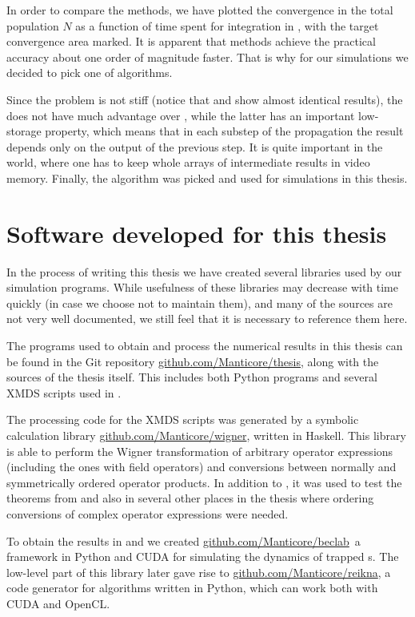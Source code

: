 In order to compare the methods, we have plotted the convergence in the total population $N$ as a function of time spent for integration in , with the target convergence area marked.
It is apparent that  methods achieve the practical accuracy about one order of magnitude faster.
That is why for our simulations we decided to pick one of  algorithms.

Since the problem is not stiff (notice that  and  show almost identical results), the  does not have much advantage over , while the latter has an important low-storage property, which means that in each substep of the  propagation the result depends only on the output of the previous step.
It is quite important in the  world, where one has to keep whole arrays of intermediate results in video memory.
Finally, the  algorithm was picked and used for simulations in this thesis.


\section{Software developed for this thesis}

In the process of writing this thesis we have created several libraries used by our simulation programs.
While usefulness of these libraries may decrease with time quickly (in case we choose not to maintain them), and many of the sources are not very well documented, we still feel that it is necessary to reference them here.

The programs used to obtain and process the numerical results in this thesis can be found in the Git repository \href{http://github.com/Manticore/thesis}{github.com/Manticore/thesis}, along with the sources of the thesis itself.
This includes both Python programs and several XMDS scripts used in .

The processing code for the XMDS scripts was generated by a symbolic calculation library \href{http://github.com/Manticore/wigner}{github.com/Manticore/wigner}, written in Haskell.
This library is able to perform the Wigner transformation of arbitrary operator expressions (including the ones with field operators) and conversions between normally and symmetrically ordered operator products.
In addition to , it was used to test the theorems from  and also in several other places in the thesis where ordering conversions of complex operator expressions were needed.

To obtain the results in  and  we created \href{http://github.com/Manticore/beclab}{github.com/Manticore/beclab} a framework in Python and CUDA for simulating the dynamics of trapped s.
The low-level part of this library later gave rise to \href{http://github.com/Manticore/reikna}{github.com/Manticore/reikna}, a code generator for  algorithms written in Python, which can work both with CUDA and OpenCL.
